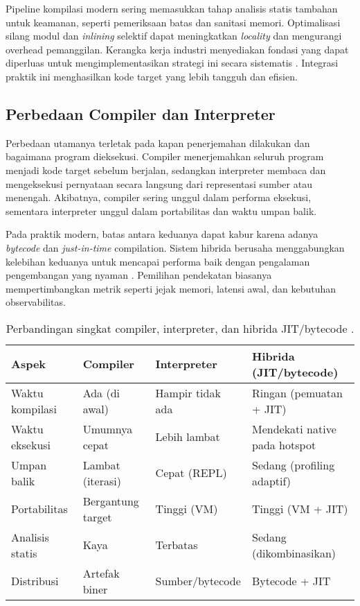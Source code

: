 \documentclass[../main.tex]{subfiles}
\begin{document}
Pipeline kompilasi modern sering memasukkan tahap analisis statis tambahan untuk keamanan, seperti pemeriksaan batas dan sanitasi memori. Optimalisasi silang modul dan \emph{inlining} selektif dapat meningkatkan \emph{locality} dan mengurangi overhead pemanggilan. Kerangka kerja industri menyediakan fondasi yang dapat diperluas untuk mengimplementasikan strategi ini secara sistematis \citep{LLVMOverview,GCCInternals}. Integrasi praktik ini menghasilkan kode target yang lebih tangguh dan efisien.

\subsection{Perbedaan Compiler dan Interpreter}
Perbedaan utamanya terletak pada kapan penerjemahan dilakukan dan bagaimana program dieksekusi. Compiler menerjemahkan seluruh program menjadi kode target sebelum berjalan, sedangkan interpreter membaca dan mengeksekusi pernyataan secara langsung dari representasi sumber atau menengah. Akibatnya, compiler sering unggul dalam performa eksekusi, sementara interpreter unggul dalam portabilitas dan waktu umpan balik.

Pada praktik modern, batas antara keduanya dapat kabur karena adanya \emph{bytecode} dan \emph{just-in-time} compilation. Sistem hibrida berusaha menggabungkan kelebihan keduanya untuk mencapai performa baik dengan pengalaman pengembangan yang nyaman \citep{CS143}. Pemilihan pendekatan biasanya mempertimbangkan metrik seperti jejak memori, latensi awal, dan kebutuhan observabilitas.

\begin{table}[t]
  \centering
  \caption{Perbandingan singkat compiler, interpreter, dan hibrida JIT/bytecode \citep{WikiJIT,WikiBytecode}.}
  \label{tab:comp-int-jit}
  \begin{tabular}{@{}llll@{}}
    \toprule
    \textbf{Aspek} & \textbf{Compiler} & \textbf{Interpreter} & \textbf{Hibrida (JIT/bytecode)} \\
    \midrule
    Waktu kompilasi & Ada (di awal) & Hampir tidak ada & Ringan (pemuatan + JIT) \\
    Waktu eksekusi & Umumnya cepat & Lebih lambat & Mendekati native pada hotspot \\
    Umpan balik & Lambat (iterasi) & Cepat (REPL) & Sedang (profiling adaptif) \\
    Portabilitas & Bergantung target & Tinggi (VM) & Tinggi (VM + JIT) \\
    Analisis statis & Kaya & Terbatas & Sedang (dikombinasikan) \\
    Distribusi & Artefak biner & Sumber/bytecode & Bytecode + JIT \\
    \bottomrule
  \end{tabular}
\end{table}
\end{document}
